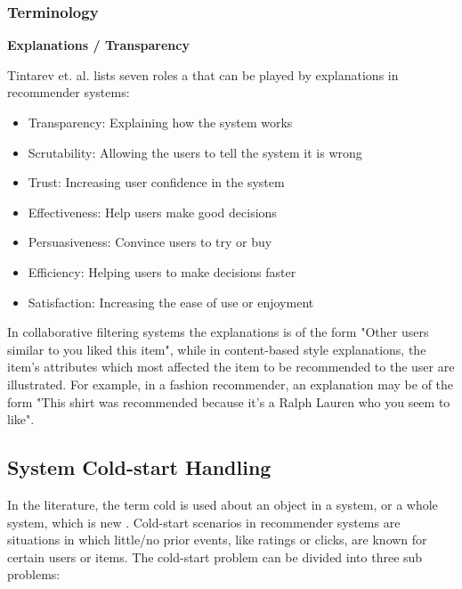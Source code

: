 \subsubsection{Terminology}


\textbf{Explanations / Transparency}

Tintarev et. al. \cite{Tintarev2007} lists seven roles a that can be played by explanations in recommender systems:

\begin{itemize}
\item Transparency: Explaining how the system works
\item Scrutability: Allowing the users to tell the system it is wrong
\item Trust: Increasing user confidence in the system
\item Effectiveness: Help users make good decisions
\item Persuasiveness: Convince users to try or buy
\item Efficiency: Helping users to make decisions faster
\item Satisfaction: Increasing the ease of use or enjoyment
\end{itemize}

In collaborative filtering systems the explanations is of the form "Other users similar to you liked this item", while in content-based style explanations, the item's attributes which most affected the item to be recommended to the user are illustrated. For example, in a fashion recommender, an explanation may be of the form "This shirt was recommended because it's a Ralph Lauren who you seem to like".

\subsection{System Cold-start Handling}


In the literature, the term cold is used about an object in a system, or a
whole system, which is new \cite{Schein2002, Park2006}. Cold-start scenarios in recommender systems are
situations in which little/no prior events, like ratings or clicks, are known
for certain users or items. The cold-start problem can be divided into three sub problems:

